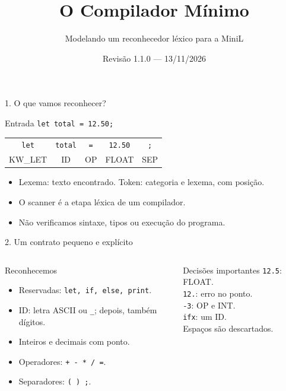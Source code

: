 \documentclass[aspectratio=169,11pt]{beamer}
\title[MiniL]{O Compilador Mínimo}
\subtitle{Modelando um reconhecedor léxico para a MiniL}
\author[Equipe]{\small\grupo}
\institute{Linguagens Formais e Autômatos Finitos}
\date{Revisão 1.1.0 --- 13/11/2026}
\begin{document}
\begin{frame}\titlepage\end{frame}

\begin{frame}{1. O que vamos reconhecer?}
\begin{block}{Entrada}
\texttt{let total = 12.50;}
\end{block}
\begin{center}
\begin{tabular}{ccccc}
\toprule \texttt{let}&\texttt{total}&\texttt{=}&\texttt{12.50}&\texttt{;}\\
KW\_LET & ID & OP & FLOAT & SEP\\\bottomrule
\end{tabular}
\end{center}
\begin{itemize}
\item Lexema: texto encontrado. Token: categoria e lexema, com posição.
\item O scanner é a etapa léxica de um compilador.
\item Não verificamos sintaxe, tipos ou execução do programa.
\end{itemize}
\end{frame}

\begin{frame}{2. Um contrato pequeno e explícito}
\begin{columns}[T]
\begin{block}{Reconhecemos}
\begin{itemize}
\item Reservadas: \texttt{let, if, else, print}.
\item ID: letra ASCII ou \texttt{\_}; depois, também dígitos.
\item Inteiros e decimais com ponto.
\item Operadores: \texttt{+ - * / =}.
\item Separadores: \texttt{( ) ;}.
\end{itemize}
\end{block}
\begin{exampleblock}{Decisões importantes}
\texttt{12.5}: FLOAT.\\[2mm]
\texttt{12.}: erro no ponto.\\[2mm]
\texttt{-3}: OP e INT.\\[2mm]
\texttt{ifx}: um ID.\\[2mm]
Espaços são descartados.
\end{exampleblock}
\end{columns}
\end{frame}
\end{document}
